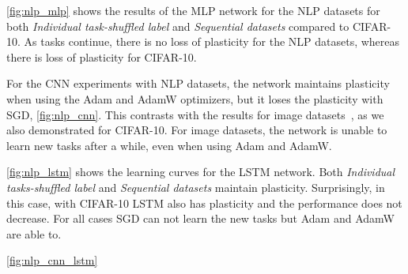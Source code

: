 \autoref{fig:nlp_mlp} shows the results of the MLP network for the NLP datasets for both \textit{Individual task-shuffled label} and \textit{Sequential datasets} compared to CIFAR-10. As tasks continue, there is no loss of plasticity for the NLP datasets, whereas there is loss of plasticity for CIFAR-10.


For the CNN experiments with NLP datasets, the network maintains plasticity when using the Adam and AdamW optimizers, but it loses the plasticity with SGD, \autoref{fig:nlp_cnn}. This contrasts with the results for image datasets~\cite{plasticity papers}, as we also demonstrated for CIFAR-10. For image datasets, the network is unable to learn new tasks after a while, even when using Adam and AdamW.

\autoref{fig:nlp_lstm} shows the learning curves for the LSTM network. Both \textit{Individual tasks-shuffled label} and \textit{Sequential datasets} maintain plasticity. Surprisingly, in this case, with CIFAR-10 LSTM also has plasticity and the performance does not decrease. For all cases SGD can not learn the new tasks but Adam and AdamW are able to.

\autoref{fig:nlp_cnn_lstm}










